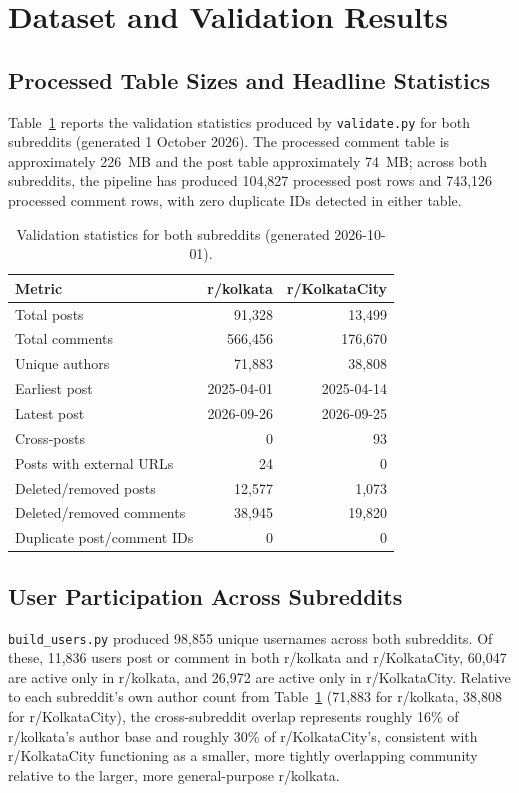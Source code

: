 \documentclass[12pt]{article}
\begin{document}
\section{Dataset and Validation Results}

\subsection{Processed Table Sizes and Headline Statistics}
Table~\ref{tab:validation} reports the validation statistics produced by \texttt{validate.py} for
both subreddits (generated 1 October 2026). The processed comment table is approximately 226~MB
and the post table approximately 74~MB; across both subreddits, the pipeline has produced 104,827
processed post rows and 743,126 processed comment rows, with zero duplicate IDs detected in
either table.

\begin{table}[h]
\centering
\small
\caption{Validation statistics for both subreddits (generated 2026-10-01).}
\label{tab:validation}
\begin{tabular}{lrr}
\toprule
\textbf{Metric} & \textbf{r/kolkata} & \textbf{r/KolkataCity} \\
\midrule
Total posts & 91{,}328 & 13{,}499 \\
Total comments & 566{,}456 & 176{,}670 \\
Unique authors & 71{,}883 & 38{,}808 \\
Earliest post & 2025-04-01 & 2025-04-14 \\
Latest post & 2026-09-26 & 2026-09-25 \\
Cross-posts & 0 & 93 \\
Posts with external URLs & 24 & 0 \\
Deleted/removed posts & 12{,}577 & 1{,}073 \\
Deleted/removed comments & 38{,}945 & 19{,}820 \\
Duplicate post/comment IDs & 0 & 0 \\
\bottomrule
\end{tabular}
\end{table}
\vspace{-0.5cm}

\subsection{User Participation Across Subreddits}
\texttt{build\_users.py} produced 98,855 unique usernames across both subreddits. Of these,
11,836 users post or comment in both r/kolkata and r/KolkataCity, 60,047 are active only in
r/kolkata, and 26,972 are active only in r/KolkataCity. Relative to each subreddit's own author
count from Table~\ref{tab:validation} (71,883 for r/kolkata, 38,808 for r/KolkataCity), the
cross-subreddit overlap represents roughly 16\% of r/kolkata's author base and roughly 30\% of
r/KolkataCity's, consistent with r/KolkataCity functioning as a smaller, more tightly overlapping
community relative to the larger, more general-purpose r/kolkata.
\end{document}
